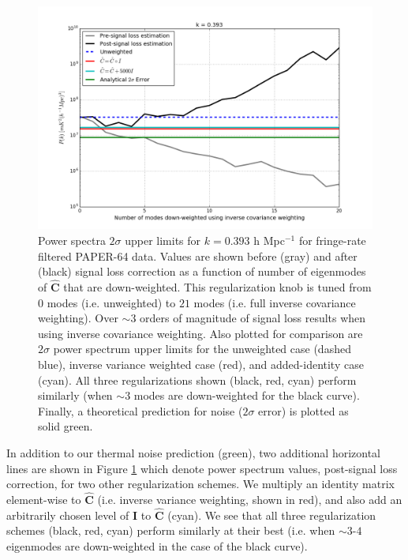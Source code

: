 \documentclass[preprint2,numberedappendix,tighten]{aastex6}  %
\begin{document}
\begin{figure}
	\centering
	\includegraphics[width=1\textwidth]{plots/sigloss_modeloop.png}
	\caption{Power spectra $2\sigma$ upper limits for $k=0.393$ h Mpc$^{-1}$ for fringe-rate filtered PAPER-64 data. Values 
are shown before (gray) and after (black) signal loss correction as a function of number of eigenmodes of $\hat{\textbf{C}}$ that 
are down-weighted. This regularization knob is tuned from $0$ modes (i.e. unweighted) to $21$ modes (i.e. full inverse 
covariance weighting). Over $\sim3$ orders of magnitude of signal loss results when using inverse covariance weighting. Also 
plotted for comparison are $2\sigma$ power spectrum upper limits for the unweighted case (dashed blue), inverse variance 
weighted case (red), and added-identity case (cyan). All three regularizations shown (black, red, cyan) perform similarly (when 
$\sim$$3$ modes are down-weighted for the black curve). Finally, a theoretical prediction for noise ($2\sigma$ error) is plotted 
as solid green.}
	\label{fig:sigloss_modeloop}
\end{figure}

In addition to our thermal noise prediction (green), two additional horizontal lines are shown in Figure \ref{fig:sigloss_modeloop} 
which denote power spectrum values, post-signal loss correction, for two other regularization schemes. We multiply an identity 
matrix element-wise to $\hat{\textbf{C}}$ (i.e. inverse variance weighting, shown in red), and also add an arbitrarily chosen level 
of $\textbf{I}$ to $\hat{\textbf{C}}$ (cyan). We see that all three regularization schemes (black, red, cyan) perform similarly at 
their best (i.e. when $\sim3$-$4$ eigenmodes are down-weighted in the case of the black curve).
\end{document}
